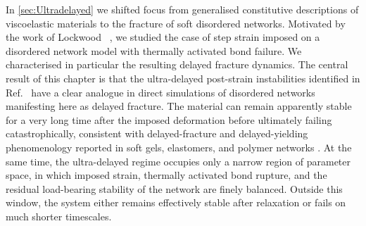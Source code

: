 \documentclass[asymmetricmargins]{library/duthesis}%
\begin{document}



In \cref{sec:Ultradelayed} we shifted focus from generalised constitutive descriptions of viscoelastic materials to the fracture of soft disordered networks. Motivated by the work of Lockwood \etal~\cite{lockwood_ultradelayed_2025}, we studied the case of step strain imposed on a disordered network model with thermally activated bond failure. We characterised in particular the resulting delayed fracture dynamics. The central result of this chapter is that the ultra-delayed post-strain instabilities identified in Ref.~\cite{lockwood_ultradelayed_2025} have a clear analogue in direct simulations of disordered networks manifesting here as delayed fracture. The material can remain apparently stable for a very long time after the imposed deformation before ultimately failing catastrophically, consistent with delayed-fracture and delayed-yielding phenomenology reported in soft gels, elastomers, and polymer networks \cite{sprakel_stress_2011,blindstrom_structures_2012,van_der_kooij_laser_2018,wangDelayedFractureGels2012,Ju2023}. At the same time, the ultra-delayed regime occupies only a narrow region of parameter space, in which imposed strain, thermally activated bond rupture, and the residual load-bearing stability of the network are finely balanced. Outside this window, the system either remains effectively stable after relaxation or fails on much shorter timescales.
\end{document}
